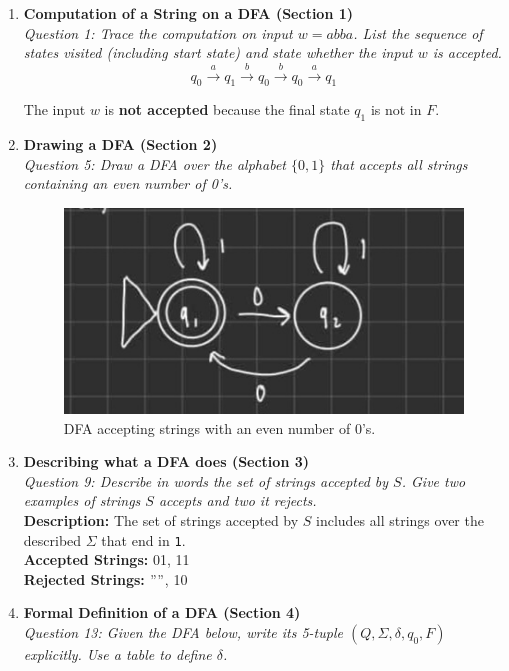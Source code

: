 \documentclass[10pt,letterpaper,unboxed,cm]{article}
\begin{document}
\begin{enumerate}

\item \textbf{Computation of a String on a DFA (Section 1)} \\
\emph{Question 1: Trace the computation on input $w = abba$. 
List the sequence of states visited (including start state) and state whether the input $w$ is accepted.} \\

\[
q_0 \xrightarrow{a} q_1 \xrightarrow{b} q_0 \xrightarrow{b} q_0 \xrightarrow{a} q_1
\]

The input $w$ is \textbf{not accepted} because the final state $q_1$ is not in $F$.

\item \textbf{Drawing a DFA (Section 2)} \\
\emph{Question 5: Draw a DFA over the alphabet $\{0,1\}$ that accepts all strings containing an even number of 0’s.}

\begin{figure}[h!]
    \centering
    \includegraphics[width=0.75\linewidth]{images/cse105q5.png}
    \caption{DFA accepting strings with an even number of 0’s.}
\end{figure}

\item \textbf{Describing what a DFA does (Section 3)} \\
\emph{Question 9: Describe in words the set of strings accepted by $S$.
Give two examples of strings $S$ accepts and two it rejects.} \\

\textbf{Description:} The set of strings accepted by $S$ includes all strings over the described $\Sigma$ that end in \texttt{1}. \\[0.5em]
\textbf{Accepted Strings:} 01, 11 \\
\textbf{Rejected Strings:} $" "$, 10

\pagebreak

\item \textbf{Formal Definition of a DFA (Section 4)} \\
\emph{Question 13: Given the DFA below, write its 5-tuple $(Q, \Sigma, \delta, q_0, F)$ explicitly. Use a table to define $\delta$.} \\


\end{enumerate}
\end{document}
